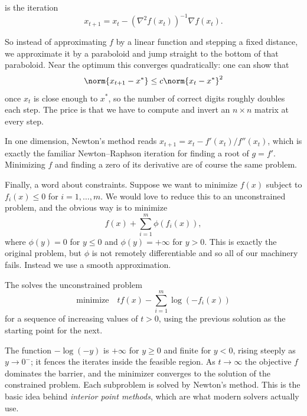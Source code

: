 \begin{definition}
     is the iteration
    $$
    x_{t + 1} = x_t - \left(\nabla^2 f(x_t)\right)^{-1}\nabla f(x_t).
    $$
\end{definition}

So instead of approximating $f$ by a linear function and stepping a fixed distance, we approximate it by a paraboloid and jump straight to the bottom of that paraboloid. Near the optimum this converges quadratically: one can show that
$$
\norm{x_{t+1} - x^*} \leq c\norm{x_t - x^*}^2
$$
once $x_t$ is close enough to $x^*$, so the number of correct digits roughly doubles each step. The price is that we have to compute and invert an $n \times n$ matrix at every step.

\begin{remark}
    In one dimension, Newton's method reads $x_{t+1} = x_t - f'(x_t)/f''(x_t)$, which is exactly the familiar Newton--Raphson iteration for finding a root of $g = f'$. Minimizing $f$ and finding a zero of its derivative are of course the same problem.
\end{remark}

Finally, a word about constraints. Suppose we want to minimize $f(x)$ subject to $f_i(x) \leq 0$ for $i = 1, \dots, m$. We would love to reduce this to an unconstrained problem, and the obvious way is to minimize
$$
f(x) + \sum_{i = 1}^m \phi(f_i(x)),
$$
where $\phi(y) = 0$ for $y \leq 0$ and $\phi(y) = +\infty$ for $y > 0$. This is exactly the original problem, but $\phi$ is not remotely differentiable and so all of our machinery fails. Instead we use a smooth approximation.

\begin{definition}
    The  solves the unconstrained problem
    $$
    \text{minimize} \quad tf(x) - \sum_{i = 1}^m \log(-f_i(x))
    $$
    for a sequence of increasing values of $t > 0$, using the previous solution as the starting point for the next.
\end{definition}

The function $-\log(-y)$ is $+\infty$ for $y \geq 0$ and finite for $y < 0$, rising steeply as $y \rightarrow 0^-$; it fences the iterates inside the feasible region. As $t \rightarrow \infty$ the objective $f$ dominates the barrier, and the minimizer converges to the solution of the constrained problem. Each subproblem is solved by Newton's method. This is the basic idea behind \emph{interior point methods}, which are what modern solvers actually use.

